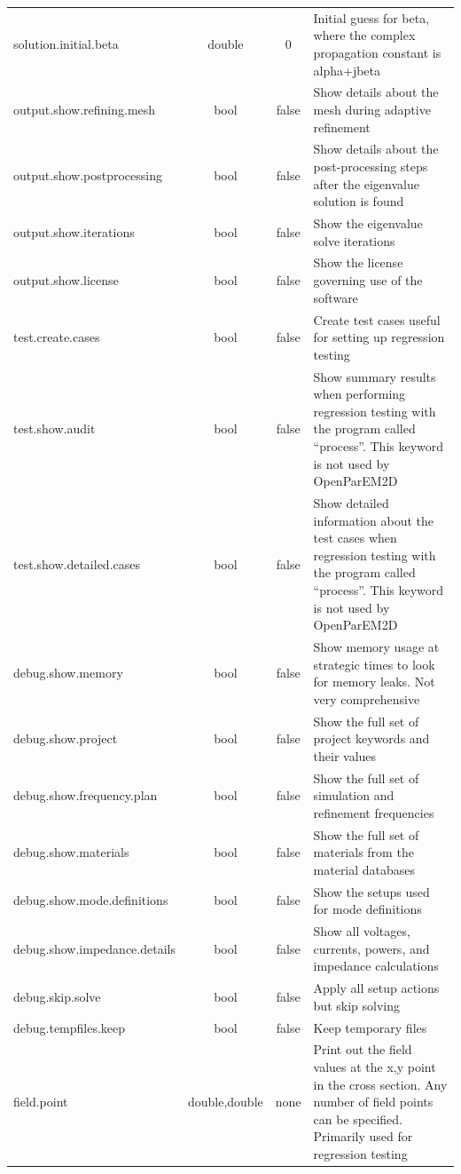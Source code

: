 \documentclass[titlepage]{article}
\renewcommand\_{\textunderscore\linebreak[1]}
\begin{document}
\begin{longtable}[c]{|lccp{8cm}|}
    solution.initial.beta         & double & 0      & Initial guess for beta, where the complex propagation constant is alpha+jbeta \\
    output.show.refining.mesh     & bool   & false  & Show details about the mesh during adaptive refinement \\
    output.show.postprocessing    & bool   & false  & Show details about the post-processing steps after the eigenvalue solution is found \\
    output.show.iterations        & bool   & false  & Show the eigenvalue solve iterations \\
    output.show.license           & bool   & false  & Show the license governing use of the software \\
    test.create.cases             & bool   & false  & Create test cases useful for setting up regression testing \\
    test.show.audit               & bool   & false  & Show summary results when performing regression testing with the program called “process”.  This keyword is not used by OpenParEM2D \\
    test.show.detailed.cases      & bool   & false  & Show detailed information about the test cases when regression testing with the program called “process”.  This keyword is not used by OpenParEM2D \\
    debug.show.memory             & bool   & false  & Show memory usage at strategic times to look for memory leaks.  Not very comprehensive \\
    debug.show.project            & bool   & false  & Show the full set of project keywords and their values \\
    debug.show.frequency.plan     & bool   & false  & Show the full set of simulation and refinement frequencies \\
    debug.show.materials          & bool   & false  & Show the full set of materials from the material databases \\
    debug.show.mode.definitions   & bool   & false  & Show the setups used for mode definitions \\
    debug.show.impedance.details  & bool   & false  & Show all voltages, currents, powers, and impedance calculations \\
    debug.skip.solve              & bool   & false  & Apply all setup actions but skip solving \\
    debug.tempfiles.keep          & bool   & false  & Keep temporary files \\
    field.point                   & double,double & none & Print out the field values at the x,y point in the cross section.  Any number of field points can be specified.  Primarily used for regression testing \\

    \hline
\end{longtable}
\end{document}
